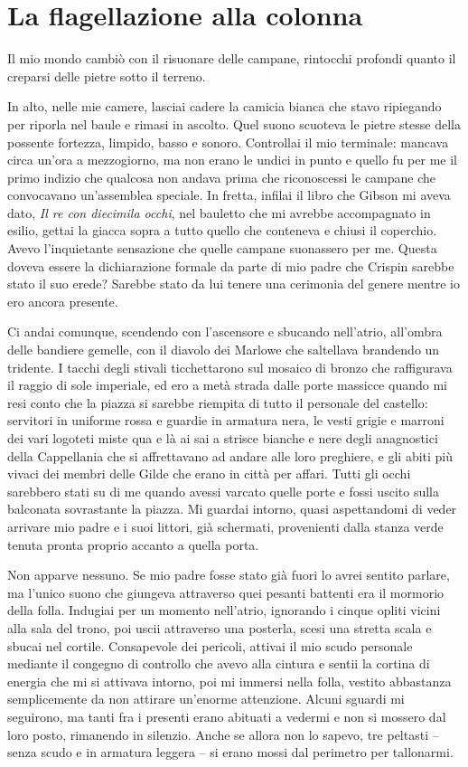 \chapter{La flagellazione alla colonna}

Il mio mondo cambiò con il risuonare delle campane, rintocchi profondi
quanto il creparsi delle pietre sotto il terreno.

In alto, nelle mie camere, lasciai cadere la camicia bianca che stavo
ripiegando per riporla nel baule e rimasi in ascolto. Quel suono
scuoteva le pietre stesse della possente fortezza, limpido, basso e
sonoro. Controllai il mio terminale: mancava circa un'ora a mezzogiorno,
ma non erano le undici in punto e quello fu per me il primo indizio che
qualcosa non andava prima che riconoscessi le campane che convocavano
un'assemblea speciale. In fretta, infilai il libro che Gibson mi aveva
dato, \emph{Il re con diecimila occhi}, nel bauletto che mi avrebbe
accompagnato in esilio, gettai la giacca sopra a tutto quello che
conteneva e chiusi il coperchio. Avevo l'inquietante sensazione che
quelle campane suonassero per me. Questa doveva essere la dichiarazione
formale da parte di mio padre che Crispin sarebbe stato il suo erede?
Sarebbe stato da lui tenere una cerimonia del genere mentre io ero
ancora presente.

Ci andai comunque, scendendo con l'ascensore e sbucando nell'atrio,
all'ombra delle bandiere gemelle, con il diavolo dei Marlowe che
saltellava brandendo un tridente. I tacchi degli stivali ticchettarono
sul mosaico di bronzo che raffigurava il raggio di sole imperiale, ed
ero a metà strada dalle porte massicce quando mi resi conto che la
piazza si sarebbe riempita di tutto il personale del castello: servitori
in uniforme rossa e guardie in armatura nera, le vesti grigie e marroni
dei vari logoteti miste qua e là ai sai a strisce bianche e nere degli
anagnostici della Cappellania che si {affrettavano} ad andare alle loro
preghiere, e gli abiti più vivaci dei membri delle Gilde che erano in
città per affari. Tutti gli occhi sarebbero stati su di me quando avessi
varcato quelle porte e fossi uscito sulla balconata sovrastante la
piazza. Mi guardai intorno, quasi aspettandomi di veder arrivare mio
padre e i suoi littori, già schermati, provenienti dalla stanza verde
tenuta pronta proprio accanto a quella porta.

Non apparve nessuno. Se mio padre fosse stato già fuori lo avrei sentito
parlare, ma l'unico suono che giungeva attraverso quei pesanti battenti
era il mormorio della folla. Indugiai per un momento nell'atrio,
ignorando i cinque opliti vicini alla sala del trono, poi uscii
attraverso una posterla, scesi una stretta scala e sbucai nel cortile.
Consapevole dei pericoli, attivai il mio scudo personale mediante il
congegno di controllo che avevo alla cintura e sentii la cortina di
energia che mi si attivava intorno, poi mi immersi nella folla, vestito
abbastanza semplicemente da non attirare un'enorme attenzione. Alcuni
sguardi mi seguirono, ma tanti fra i presenti erano abituati a vedermi e
non si mossero dal loro posto, rimanendo in silenzio. Anche se allora
non lo sapevo, tre peltasti -- senza scudo e in armatura leggera -- si
erano mossi dal perimetro per tallonarmi.


